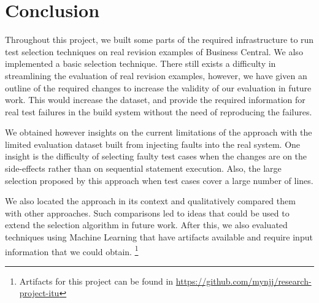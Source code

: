 \documentclass{article}
\begin{document}
\section{Conclusion}

Throughout this project, we built some parts of the required infrastructure to run test selection techniques on real revision examples of Business Central. We also implemented a basic selection technique. There still exists a difficulty in streamlining the evaluation of real revision examples, however, we have given an outline of the required changes to increase the validity of our evaluation in future work. This would increase the dataset, and provide the required information for real test failures in the build system without the need of reproducing the failures.

We obtained however insights on the current limitations of the approach with the limited evaluation dataset built from injecting faults into the real system. One insight is the difficulty of selecting faulty test cases when the changes are on the side-effects rather than on sequential statement execution. Also, the large selection proposed by this approach when test cases cover a large number of lines.

We also located the approach in its context and qualitatively compared them with other approaches. Such comparisons led to ideas that could be used to extend the selection algorithm in future work. After this, we also evaluated techniques using Machine Learning that have artifacts available and require input information that we could obtain. \footnote{Artifacts for this project can be found in \href{https://github.com/mynjj/research-project-itu}{https://github.com/mynjj/research-project-itu}}
\end{document}
